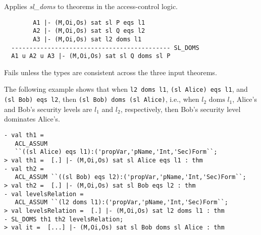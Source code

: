 

\egroup

\SYNOPSIS
Applies \emph{sl\_doms} to theorems in the access-control logic.

\DESCRIBE

\begin{verbatim}
        A1 |- (M,Oi,Os) sat sl P eqs l1
        A2 |- (M,Oi,Os) sat sl Q eqs l2
        A3 |- (M,Oi,Os) sat l2 doms l1
  -------------------------------------------- SL_DOMS
  A1 u A2 u A3 |- (M,Oi,Os) sat sl Q doms sl P
\end{verbatim}

\FAILURE 
Fails unless the types are consistent across the three
input theorems.

\EXAMPLE 
The following example shows that when \texttt{l2 doms l1},
\texttt{(sl Alice) eqs l1}, and \texttt{(sl Bob) eqs l2}, then
\texttt{(sl Bob) doms (sl Alice)}, i.e., when $l_2 \text{ doms }l_1$,
Alice's and Bob's security levels are $l_1$ and $l_2$, respectively,
then Bob's security level dominates Alice's.
\begin{holboxed}
\begin{verbatim}
- val th1 = 
   ACL_ASSUM 
   ``((sl Alice) eqs l1):('propVar,'pName,'Int,'Sec)Form``;
> val th1 =  [.] |- (M,Oi,Os) sat sl Alice eqs l1 : thm
- val th2 = 
   ACL_ASSUM ``((sl Bob) eqs l2):('propVar,'pName,'Int,'Sec)Form``;
> val th2 =  [.] |- (M,Oi,Os) sat sl Bob eqs l2 : thm
- val levelsRelation = 
   ACL_ASSUM ``(l2 doms l1):('propVar,'pName,'Int,'Sec)Form``;
> val levelsRelation =  [.] |- (M,Oi,Os) sat l2 doms l1 : thm
- SL_DOMS th1 th2 levelsRelation;
> val it =  [...] |- (M,Oi,Os) sat sl Bob doms sl Alice : thm
\end{verbatim}
\end{holboxed}


